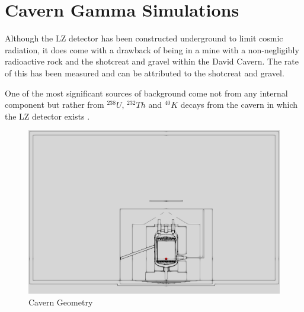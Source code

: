 \section{Cavern Gamma Simulations}

\par
Although the LZ detector has been constructed underground to limit cosmic radiation, it does come with a drawback of being in a mine with a non-negligibly radioactive rock and the shotcreat and gravel within the David Cavern.
The rate of this has been measured and can be attributed to the shotcreat and gravel. 

One of the most significant sources of background come not from any internal component but rather from $^{238}U$, $^{232}Th$ and $^{40}K$ decays from the cavern in which the LZ detector exists \cite{LZ_Gamma_Ray_Background_ref}.


\begin{figure}[!htbp]
\includegraphics[width=\textwidth]{Figures/Simulations/cavern_geometry_2.png}
\centering
\caption{Cavern Geometry}
\label{fig:Cavern_Geometry}
\end{figure}